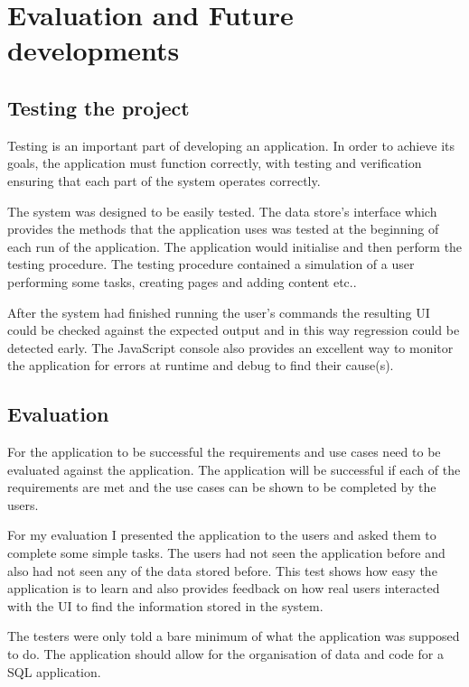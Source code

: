 \chapter{Evaluation and Future
developments}\label{evaluation-and-future-developments}

\section{Testing the project}\label{testing-the-project}

Testing is an important part of developing an application. In order to achieve
its goals, the application must function correctly, with testing and
verification ensuring that each part of the system operates correctly.

The system was designed to be easily tested. The data store's interface
which provides the methods that the application uses was tested at the
beginning of each run of the application. The application would
initialise and then perform the testing procedure. The testing procedure
contained a simulation of a user performing some tasks, creating pages
and adding content etc..

After the system had finished running the user's commands the resulting
UI could be checked against the expected output and in this way
regression could be detected early. The JavaScript console also provides
an excellent way to monitor the application for errors at runtime and
debug to find their cause(s).

\section{Evaluation}\label{evaluation}

For the application to be successful the requirements and use cases need
to be evaluated against the application. The application will be
successful if each of the requirements are met and the use cases can be
shown to be completed by the users.

For my evaluation I presented the application to the users and asked them
to complete some simple tasks. The users had not seen the application
before and also had not seen any of the data stored before. This test
shows how easy the application is to learn and also provides
feedback on how real users interacted with the UI to find the
information stored in the system.

The testers were only told a bare minimum of what the application was
supposed to do. The application should allow for the organisation of
data and code for a SQL application.

